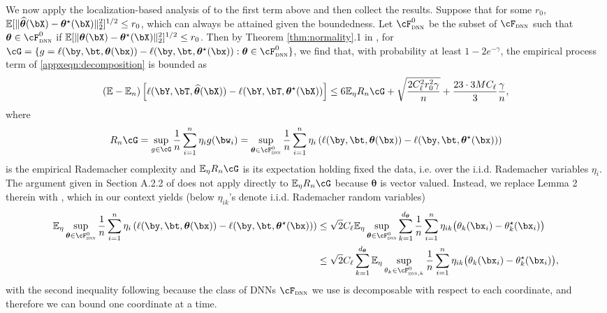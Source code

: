 \documentclass[12pt]{article}
\numberwithin{equation}{section}
\theoremstyle{definition}
\newcommand{\E}{\mathbb{E}}
\newcommand{\btheta}{\boldsymbol{\theta}}
\newcommand{\ttrue}{\theta^\star}
\newcommand{\bttrue}{\btheta^\star}
\newcommand{\bthat}{\bm{\widehat{\theta}}}
\newcommand{\dtheta}{d_{\btheta}}  %
\begin{document}
\begin{appendices}
We now apply the localization-based analysis of \cite{Farrell-Liang-Misra2021_Ecma} to the first term above and then collect the results. Suppose that for some $r_0$, $\E[ \|\bthat(\bX) - \bttrue (\bX) \|_2^2 ]^{1/2} \leq r_0$, which can always be attained given the boundedness. Let $\cF^0_{\textsc{dnn}}$ be the subset of $\cF_{\textsc{dnn}}$ such that $\btheta \in \cF^0_{\textsc{dnn}}$ if $\E[ \|\btheta(\bX) - \bttrue (\bX) \|_2^2 ]^{1/2} \leq r_0$. Then by Theorem \ref{thm:normality}.1 in \cite{bartlett2005local}, for $\cG = \{g = \ell(\by,\bt,\btheta(\bx)) - \ell(\by,\bt,\bttrue(\bx)) : \btheta \in  \cF^0_{\textsc{dnn}}\}$, we find that, with probability at least $1-2e^{-\gamma}$, the empirical process term of \eqref{appxeqn:decomposition} is bounded as
\begin{equation}
	\label{appxeqn:apply-sym-one-step}
	\left( \E - \E_n \right)\left[ \ell(\bY,\bT,\bthat(\bX)) - \ell(\bY,\bT,\bttrue(\bX)) \right]
	\leq 6 \E_\eta R_n \cG  + \sqrt{\frac{2 C_\ell^2 r_0^2 \gamma}{n}} + \frac{23 \cdot 3 M C_\ell}{3} \frac{\gamma}{n},
\end{equation}
where 
\[
    R_n \cG = \sup_{g \in \cG} \frac{1}{n}\sum_{i=1}^n \eta_i g(\bw_i) = \sup_{\btheta \in  \cF^0_{\textsc{dnn}} } \frac{1}{n}\sum_{i=1}^n \eta_i \left( \ell(\by,\bt,\btheta(\bx)) - \ell(\by,\bt,\bttrue(\bx)) \right) 
\]
is the empirical Rademacher complexity and $\E_\eta R_n \cG$ is its expectation holding fixed the data, i.e. over the i.i.d. Rademacher variables $\eta_i$. The argument given in Section A.2.2 of \cite{Farrell-Liang-Misra2021_Ecma} does not apply directly to $\E_\eta R_n \cG$ because $\btheta$ is vector valued. Instead, we replace Lemma 2 therein with \citet[Corollary 1]{Maurer2016VectorContraction}, which in our context yields (below $\eta_{ik}$'s denote i.i.d. Rademacher random variables)
\begin{align*}
    \E_{\eta} \sup_{\btheta \in  \cF^0_{\textsc{dnn}} } \frac{1}{n}\sum_{i=1}^n \eta_i \left( \ell(\by,\bt,\btheta(\bx)) - \ell(\by,\bt,\bttrue(\bx)) \right) 
    &\leq \sqrt{2} C_\ell \E_{\eta} \sup_{\btheta \in  \cF^0_{\textsc{dnn}}} \sum_{k=1}^{\dtheta} \frac{1}{n} \sum_{i=1}^n \eta_{ik} \big(\theta_k(\bx_i) - \ttrue_k(\bx_i) \big)       \\
    &\leq \sqrt{2}C_\ell \sum_{k=1}^{\dtheta} \E_{\eta} \sup_{\theta_k \in \cF^0_{\textsc{dnn},k}} \frac{1}{n} \sum_{i=1}^n \eta_{ik} \big(\theta_k(\bx_i) - \ttrue_k(\bx_i) \big),
\end{align*}
with the second inequality following because the class of DNNs $\cF_{\textsc{dnn}}$ we use is decomposable with respect to each coordinate, and therefore we can bound one coordinate at a time. 


\end{appendices}
\end{document}
